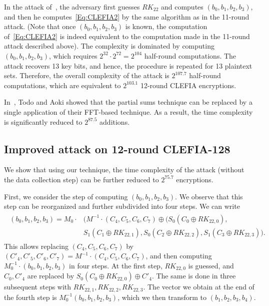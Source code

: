 In the attack of~\cite{SAC:SasWan12}, the adversary first guesses $RK_{22}$ and computes $(b_0,b_1,b_2,b_3)$, and then he computes~\eqref{Eq:CLEFIA2} by the same algorithm as in the 11-round attack. (Note that once $(b_0,b_1,b_2,b_3)$ is known, the computation of~\eqref{Eq:CLEFIA2} is indeed equivalent to the computation made in the 11-round attack described above). The complexity is dominated by computing $(b_0,b_1,b_2,b_3)$, which requires $2^{32}\cdot 2^{72}=2^{104}$ half-round computations. The attack recovers 13 key bits, and hence, the procedure is repeated for 13 plaintext sets. Therefore, the overall complexity of the attack is $2^{107.7}$ half-round computations, which are equivalent to $2^{103.1}$ 12-round CLEFIA encryptions.

In~\cite{CANS:TodAok14}, Todo and Aoki showed that the partial sums technique can be replaced by a single application of their FFT-based technique. As a result, the time complexity is significantly reduced to $2^{87.5}$ additions.

\subsection{Improved attack on 12-round CLEFIA-128}

We show that using our technique, the time complexity of the attack (without the data collection step) can be further reduced to $2^{75.7}$ encryptions.

First, we consider the step of computing $(b_0,b_1,b_2,b_3)$. We observe that this step can be reorganized and further subdivided into four steps. We can write
\begin{align*}
\begin{split}
(b_0,b_1,b_2,b_3) = M_0 \cdot &(M^{-1} \cdot (C_4,C_5,C_6,C_7) \oplus (S_0(C_0 \oplus RK_{22,0}),\\ &S_1(C_1 \oplus RK_{22,1}), 
S_0(C_2 \oplus RK_{22,2}), S_1(C_3 \oplus RK_{22,3})).    
\end{split}
\end{align*}
This allows replacing $(C_4,C_5,C_6,C_7)$ by $(C'_4,C'_5,C'_6,C'_7)=M^{-1} \cdot (C_4,C_5,C_6,C_7)$, and then computing $M_0^{-1} \cdot (b_0,b_1,b_2,b_3)$ in four steps. At the first step, $RK_{22,0}$ is guessed, and $C_0,C'_4$ are replaced by $S_0(C_0 \oplus RK_{22,0}) \oplus C'_4$. The same is done in three subsequent steps with $RK_{22,1},RK_{22,2},RK_{22,3}$. The vector we obtain at the end of the fourth step is $M_0^{-1}(b_0,b_1,b_2,b_3)$, which we then transform to $(b_1,b_2,b_3,b_4)$. 


